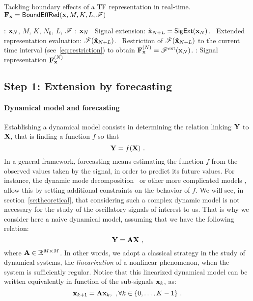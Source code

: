 \begin{algorithm}
\caption{Tackling boundary effects of a TF representation in real-time. ${\mathbf F}_{\mathbf x} = \relax{\sf BoundEffRed}({\mathbf x},M,K,L,{\mathscr F})$}
\label{alg:boundary}
\begin{algorithmic}
: ${\mathbf x}_{N}$, $M$, $K$, $N_0$, $L$, ${\mathscr F}$
\STATE \vspace{-2mm}
: ${\mathbf x}_N$
\STATE \vspace{-2mm}
\STATE \quad\textbullet\ Signal extension: $\tilde{{\mathbf x}}_{N+L} = \relax{\sf SigExt}({\mathbf x}_N)$. 
\STATE \quad\textbullet\ Extended representation evaluation: ${\mathscr F}(\tilde{{\mathbf x}}_{N+L})$.
\STATE \quad\textbullet\ Restriction of ${\mathscr F}(\tilde{{\mathbf x}}_{N+L})$ to the current time interval (see~\eqref{eq:restriction}) to obtain ${\mathbf F}_{\mathbf x}^{(N)}={\mathscr F}^{\mathrm{ext}}({\mathbf x}_N)$.
\STATE \vspace{-2mm}
: Signal representation ${\mathbf F}_{\mathbf x}^{(N)}$
\ENDWHILE
\end{algorithmic}
\end{algorithm}


\subsection{Step 1: Extension by forecasting}




\paragraph{Dynamical model and forecasting} 
Establishing a dynamical model consists in determining the relation linking ${\mathbf Y}$ to ${\mathbf X}$, that is finding a function $f$ so that
\[
{\mathbf Y} = f({\mathbf X})\ .
\]
In a general framework, forecasting means estimating the function $f$ from the observed values taken by the signal, in order to predict its future values. For instance, the dynamic mode decomposition~\cite{Schmid10dynamic,Williams15data} or other more complicated models \cite{Roberts13Gaussian,DeLivera11forecasting,west2006bayesian,vlachas2018data}, allow this by setting additional constraints on the behavior of $f$. We will see, in section~\ref{se:theoretical}, that considering such a complex dynamic model is not necessary for the study of the oscillatory signals of interest to us. That is why we consider here a naive dynamical model, assuming that we have the following relation:
\begin{equation}
\bY = \bA\bX\ ,
\label{eq:dyn.model}
\end{equation}
where ${\mathbf A}\in{\mathbb R}^{M\times M}$. In other words, we adopt a classical strategy in the study of dynamical systems, the {\em linearization} of a nonlinear phenomenon, when the system is sufficiently regular. Notice that this linearized dynamical model can be written equivalently in function of the sub-signals ${\mathbf x}_k$, as:
\begin{equation}
{\mathbf x}_{k+1} = {\mathbf A}{\mathbf x}_{k},\ ,\forall k\in\{0,\dots,K-1\}\ .
\end{equation}


